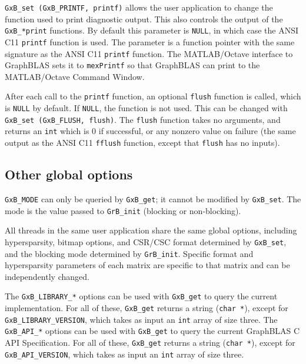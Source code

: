 \documentclass[12pt]{article}
\begin{document}
\verb'GxB_set (GxB_PRINTF, printf)' allows the user application to change the
function used to print diagnostic output.  This also controls the output of the
\verb'GxB_*print' functions.  By default this parameter is \verb'NULL', in
which case the ANSI C11 \verb'printf' function is used.  The parameter is a
function pointer with the same signature as the ANSI C11 \verb'printf'
function.  The MATLAB/Octave interface to GraphBLAS sets it to \verb'mexPrintf'
so that GraphBLAS can print to the MATLAB/Octave Command Window.

After each call to the \verb'printf' function, an optional
\verb'flush' function is called, which is \verb'NULL' by default.  If
\verb'NULL', the function is not used.  This can be changed with
\verb'GxB_set (GxB_FLUSH, flush)'.  The \verb'flush' function takes no
arguments, and returns an \verb'int' which is 0 if successful, or any nonzero
value on failure (the same output as the ANSI C11 \verb'fflush' function,
except that \verb'flush' has no inputs).

\subsection{Other global options}

\verb'GxB_MODE' can only be
queried by \verb'GxB_get'; it cannot be modified by \verb'GxB_set'.  The mode
is the value passed to \verb'GrB_init' (blocking or non-blocking).

All threads in the same user application share the same global options,
including hypersparsity, bitmap options, and CSR/CSC format determined by
\verb'GxB_set', and the blocking mode determined by \verb'GrB_init'.
Specific format and hypersparsity parameters of each matrix are specific to
that matrix and can be independently changed.

The \verb'GxB_LIBRARY_*' options can be used with \verb'GxB_get' to query the
current implementation.  For all of these, \verb'GxB_get' returns a string
(\verb'char *'), except for \verb'GxB_LIBRARY_VERSION', which takes as input an
\verb'int' array of size three.  The \verb'GxB_API_*' options can be used with
\verb'GxB_get' to query the current GraphBLAS C API Specification.  For all of
these, \verb'GxB_get' returns a string (\verb'char *'), except for
\verb'GxB_API_VERSION', which takes as input an \verb'int' array of size three.
\end{document}
